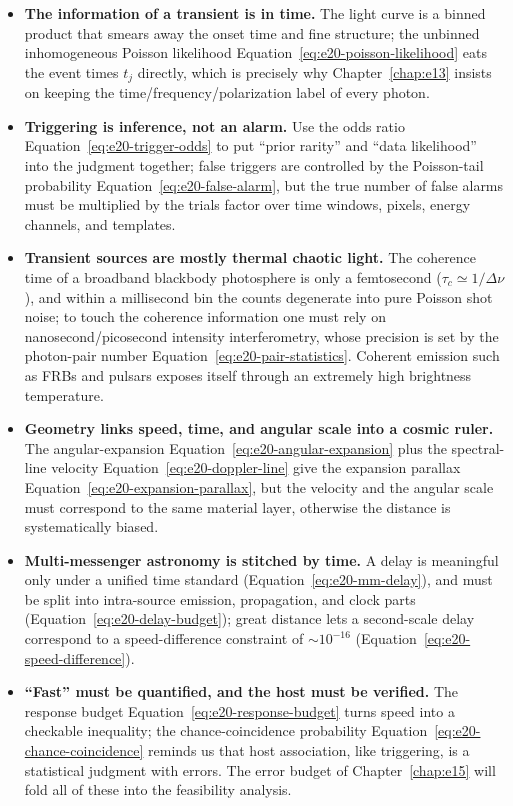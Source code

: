 \begin{itemize}
  \item \textbf{The information of a transient is in time.} The light curve is a binned product that smears away the onset time and fine structure; the unbinned inhomogeneous Poisson likelihood Equation~\eqref{eq:e20-poisson-likelihood} eats the event times \(t_j\) directly, which is precisely why Chapter~\ref{chap:e13} insists on keeping the time/frequency/polarization label of every photon.
  \item \textbf{Triggering is inference, not an alarm.} Use the odds ratio Equation~\eqref{eq:e20-trigger-odds} to put ``prior rarity'' and ``data likelihood'' into the judgment together; false triggers are controlled by the Poisson-tail probability Equation~\eqref{eq:e20-false-alarm}, but the true number of false alarms must be multiplied by the trials factor over time windows, pixels, energy channels, and templates.
  \item \textbf{Transient sources are mostly thermal chaotic light.} The coherence time of a broadband blackbody photosphere is only a femtosecond (\(\tau_c\simeq1/\Delta\nu\)), and within a millisecond bin the counts degenerate into pure Poisson shot noise; to touch the coherence information one must rely on nanosecond/picosecond intensity interferometry, whose precision is set by the photon-pair number Equation~\eqref{eq:e20-pair-statistics}. Coherent emission such as FRBs and pulsars exposes itself through an extremely high brightness temperature.
  \item \textbf{Geometry links speed, time, and angular scale into a cosmic ruler.} The angular-expansion Equation~\eqref{eq:e20-angular-expansion} plus the spectral-line velocity Equation~\eqref{eq:e20-doppler-line} give the expansion parallax Equation~\eqref{eq:e20-expansion-parallax}, but the velocity and the angular scale must correspond to the same material layer, otherwise the distance is systematically biased.
  \item \textbf{Multi-messenger astronomy is stitched by time.} A delay is meaningful only under a unified time standard (Equation~\eqref{eq:e20-mm-delay}), and must be split into intra-source emission, propagation, and clock parts (Equation~\eqref{eq:e20-delay-budget}); great distance lets a second-scale delay correspond to a speed-difference constraint of \(\sim10^{-16}\) (Equation~\eqref{eq:e20-speed-difference}).
  \item \textbf{``Fast'' must be quantified, and the host must be verified.} The response budget Equation~\eqref{eq:e20-response-budget} turns speed into a checkable inequality; the chance-coincidence probability Equation~\eqref{eq:e20-chance-coincidence} reminds us that host association, like triggering, is a statistical judgment with errors. The error budget of Chapter~\ref{chap:e15} will fold all of these into the feasibility analysis.
\end{itemize}

